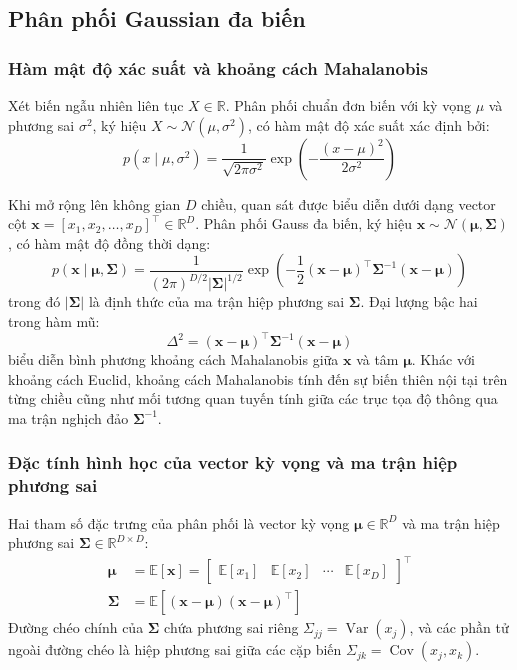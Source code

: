 \documentclass[12pt,a4paper]{article}
\newcommand{\vx}{\mathbf{x}}
\newcommand{\vmu}{\boldsymbol{\mu}}
\newcommand{\vSigma}{\boldsymbol{\Sigma}}
\newcommand{\Normal}{\mathcal{N}}
\newcommand{\Exp}{\mathbb{E}}
\newcommand{\R}{\mathbb{R}}
\DeclareMathOperator{\Var}{Var}
\DeclareMathOperator{\Cov}{Cov}
\begin{document}
\subsection{Phân phối Gaussian đa biến}
\label{subsec:multivariate_gaussian}

\subsubsection{Hàm mật độ xác suất và khoảng cách Mahalanobis}

Xét biến ngẫu nhiên liên tục $X \in \R$. Phân phối chuẩn đơn biến với kỳ vọng $\mu$ và phương sai $\sigma^2$, ký hiệu $X \sim \Normal(\mu, \sigma^2)$, có hàm mật độ xác suất xác định bởi:
\begin{equation}
    p(x \mid \mu, \sigma^2) = \frac{1}{\sqrt{2\pi\sigma^2}} \exp\left( -\frac{(x - \mu)^2}{2\sigma^2} \right)
\end{equation}

Khi mở rộng lên không gian $D$ chiều, quan sát được biểu diễn dưới dạng vector cột $\vx = [x_1, x_2, \dots, x_D]^\top \in \R^D$. Phân phối Gauss đa biến, ký hiệu $\vx \sim \Normal(\vmu, \vSigma)$, có hàm mật độ đồng thời dạng:
\begin{equation}
    p(\vx \mid \vmu, \vSigma) = \frac{1}{(2\pi)^{D/2} |\vSigma|^{1/2}} \exp\left( -\frac{1}{2} (\vx - \vmu)^\top \vSigma^{-1} (\vx - \vmu) \right) \label{eq:multivariate_pdf}
\end{equation}
trong đó $|\vSigma|$ là định thức của ma trận hiệp phương sai $\vSigma$. Đại lượng bậc hai trong hàm mũ:
\begin{equation}
    \Delta^2 = (\vx - \vmu)^\top \vSigma^{-1} (\vx - \vmu)
\end{equation}
biểu diễn bình phương khoảng cách Mahalanobis giữa $\vx$ và tâm $\vmu$. Khác với khoảng cách Euclid, khoảng cách Mahalanobis tính đến sự biến thiên nội tại trên từng chiều cũng như mối tương quan tuyến tính giữa các trục tọa độ thông qua ma trận nghịch đảo $\vSigma^{-1}$.

\subsubsection{Đặc tính hình học của vector kỳ vọng và ma trận hiệp phương sai}

Hai tham số đặc trưng của phân phối là vector kỳ vọng $\vmu \in \R^D$ và ma trận hiệp phương sai $\vSigma \in \R^{D \times D}$:
\begin{align}
    \vmu &= \Exp[\vx] = \begin{bmatrix} \Exp[x_1] & \Exp[x_2] & \cdots & \Exp[x_D] \end{bmatrix}^\top \\
    \vSigma &= \Exp\left[ (\vx - \vmu)(\vx - \vmu)^\top \right]
\end{align}
Đường chéo chính của $\vSigma$ chứa phương sai riêng $\Sigma_{jj} = \Var(x_j)$, và các phần tử ngoài đường chéo là hiệp phương sai giữa các cặp biến $\Sigma_{jk} = \Cov(x_j, x_k)$.
\end{document}
